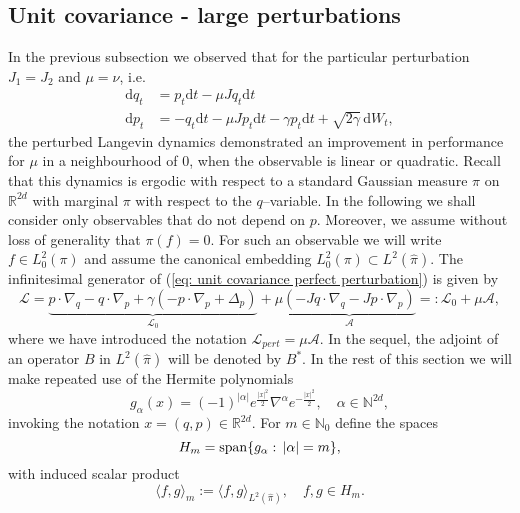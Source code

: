 \subsection{Unit covariance - large perturbations}
\label{sec:large perturbations}

In the previous subsection we observed that for the particular perturbation $J_1 = J_2$ and $\mu = \nu$, i.e. 
\begin{align}
\mathrm{d}q_{t} & =p_{t}\mathrm{d}t-\mu Jq_{t}\mathrm{d}t\nonumber \\
\mathrm{d}p_{t} & =-q_{t}\mathrm{d}t-\mu Jp_{t}\mathrm{d}t-\gamma p_{t}\mathrm{d}t+\sqrt{2\gamma}\,\mathrm{d}W_{t},\label{eq: unit covariance perfect perturbation}
\end{align}
the perturbed Langevin dynamics demonstrated an improvement in performance for $\mu$ in a neighbourhood of $0$, when the observable is linear or quadratic.  Recall that this dynamics is ergodic with respect to a standard Gaussian measure $\widehat{\pi}$ on $\mathbb{R}^{2d}$ with marginal $\pi$  with respect to the $q$--variable.  In the following we shall consider only observables that do not depend on $p$. Moreover, we assume without loss of generality that $\pi(f)=0$. For such an observable we will write $f\in L^2_0(\pi)$ and assume the canonical embedding $L^2_0(\pi)\subset L^2(\widehat{\pi})$.  The infinitesimal generator of (\ref{eq: unit covariance perfect perturbation})
is given by 
\begin{equation}
\label{eq:generator_equal}
\mathcal{L}=\underbrace{p\cdot\nabla_{q}-q\cdot\nabla_{p}+\gamma(-p\cdot\nabla_{p}+\Delta_{p})}_{\mathcal{L}_{0}}+\mu\underbrace{(-Jq\cdot\nabla_{q}-Jp\cdot\nabla_{p})}_{\mathcal{A}}=:\mathcal{L}_{0}+\mu\mathcal{A},
\end{equation}
where we have introduced the notation $\mathcal{L}_{pert}=\mu \mathcal{A}$. In the sequel, the adjoint of an operator $B$ in $L^2(\widehat{\pi})$ will be denoted by $B^{*}$. In the rest of this section we will make repeated use of the Hermite polynomials
\begin{equation}
g_{\alpha}(x)=(-1)^{\vert\alpha\vert}e^{\frac{\vert x\vert^{2}}{2}}\nabla^{\alpha}e^{-\frac{\vert x\vert^{2}}{2}},\quad\alpha\in\mathbb{N}^{2d},\label{eq: Hermite polynomials}
\end{equation}
invoking the notation $x=(q,p)\in\mathbb{R}^{2d}$. For $m\in\mathbb{N}_{0}$
define the spaces 
\[
\label{eq:Hermite spaces}
H_{m}=\operatorname{span}\{g_{\alpha}:\,\vert\alpha\vert=m\},
\]
with induced scalar product 
\[
\langle f,g\rangle_{m}:=\langle f,g\rangle_{L^2(\widehat{\pi})},\quad f,g\in H_{m}.
\]

